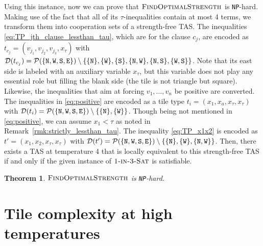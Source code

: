 \documentclass{article}
\newtheorem{theorem}{Theorem}
\theoremstyle{remark}
\theoremstyle{definition}
\newcommand{\findoptstrength}{\ensuremath{\mbox{\sc FindOptimalStrength}}}
\newcommand{\SAT}{\ensuremath{\mbox{\sc Sat}}}
\newcommand{\oneinthree}{\ensuremath{\mbox{\sc 1-in-3-\SAT}}}
\newcommand{\NP}{{\tt NP}}
\newcommand{\north}{{\tt N}}
\newcommand{\west}{{\tt W}}
\newcommand{\south}{{\tt S}}
\newcommand{\east}{{\tt E}}
\begin{document}
Using this instance, now we can prove that $\findoptstrength$ is \NP-hard. 
Making use of the fact that all of its $\tau$-inequalities contain at most 4 terms, we transform them into cooperation sets of a strength-free TAS. 
The inequalities \eqref{eq:TP_jth_clause_lessthan_tau}, which are for the clause $c_j$, are encoded as $t_{c_j} = (v_{j_1}, v_{j_2}, v_{j_3}, x_\tau)$ with $\mathcal{D}(t_{c_j}) = \mathcal{P}(\{\north, \west, \south, \east\}) \setminus \{\{\north\}, \{\west\}, \{\south\}, \{\north, \west\}, \{\north, \south\}, \{\west, \south\}\}$. 
Note that its east side is labeled with an auxiliary variable $x_\tau$, but this variable does not play any essential role but filling the blank side (the tile is not triangle but square). 
Likewise, the inequalities that aim at forcing $v_1, \ldots, v_n$ be positive are converted. 
The inequalities in \eqref{eq:positive} are encoded as a tile type $t_i = (x_1, x_a, x_\tau, x_\tau)$ with $\mathcal{D}(t_i) = \mathcal{P}(\{\north, \west, \south, \east\}) \setminus \{\{\north\}, \{\west\}\}$. 
Though being not mentioned in \eqref{eq:positive}, we can assume $x_1 < \tau$ as noted in Remark~\ref{rmk:strictly_lessthan_tau}. 
The inequality \eqref{eq:TP_x1x2} is encoded as $t' = (x_1, x_2, x_\tau, x_\tau)$ with $\mathcal{D}(t') = \mathcal{P}(\{\north, \west, \south, \east\}) \setminus \{\{\north\}, \{\west\}, \{\north, \west\}\}$. 
Then, there exists a TAS at temperature 4 that is locally equivalent to this strength-free TAS if and only if the given instance of $\oneinthree$ is satisfiable. 


\begin{theorem}\label{thm:findoptstrength_NPhard}
	$\findoptstrength$ is \NP-hard. 
\end{theorem}

	\section{Tile complexity at high temperatures}
	\label{sec:complexity}
\end{document}

